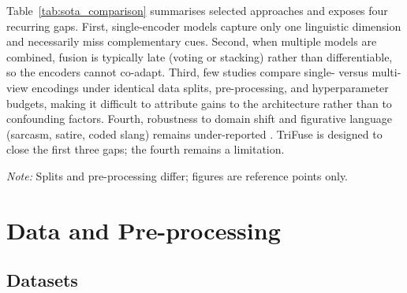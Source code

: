 \documentclass[10pt,twocolumn,a4paper]{article}
\begin{document}
Table~\ref{tab:sota_comparison} summarises selected approaches and exposes four recurring gaps. First, single-encoder models capture only one linguistic dimension and necessarily miss complementary cues. Second, when multiple models are combined, fusion is typically late (voting or stacking) rather than differentiable, so the encoders cannot co-adapt. Third, few studies compare single- versus multi-view encodings under identical data splits, pre-processing, and hyperparameter budgets, making it difficult to attribute gains to the architecture rather than to confounding factors. Fourth, robustness to domain shift and figurative language (sarcasm, satire, coded slang) remains under-reported \citep{ref37,ref38}. TriFuse is designed to close the first three gaps; the fourth remains a limitation.

\begin{table}[!t]
\caption{Selected text classification approaches in the abusive-language domain.}
\label{tab:sota_comparison}
\centering
{}

\smallskip
{\scriptsize \textit{Note:} Splits and pre-processing differ; figures are reference points only.}
\end{table}

\section{Data and Pre-processing}\label{sec:data}

\subsection{Datasets}\label{subsec:datasets}
\end{document}
